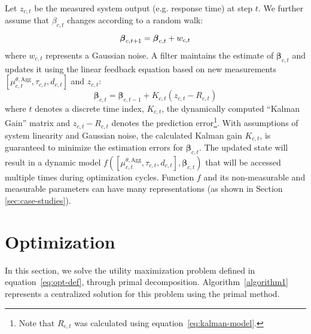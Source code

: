 Let $z_{c,t}$ be the measured system output (e.g. response time) at step $t$. 
We further assume that $\beta_{c,t}$ changes according to a random walk:
\begin{equation}
	\boldsymbol\beta_{c,t+1}=\boldsymbol\beta_{c,t}+w_{c,t} \\
\end{equation}
where $w_{c,t}$ represents a Gaussian noise.
A filter maintains the estimate of $\boldsymbol\beta_{c,t}$ and updates it using the linear feedback equation based on new measurements $\left[\mu^{\theta,\text{Agg}}_{c,t},\tau_{c,t},d_{c,t}\right]$ and $z_{c,t}$: 
\begin{equation}\label{eq:kalman-update} 
	\boldsymbol\beta_{c,t} = \boldsymbol\beta_{c,t-1}+ K_{c,t}(z_{c,t} - R_{c,t})
\end{equation}
where $t$ denotes a discrete time index, $K_{c,t}$, the dynamically computed
``Kalman Gain'' matrix and $z_{c,t}-R_{c,t}$ denotes the prediction error\footnote{Note that $R_{c,t}$ was calculated using equation~\ref{eq:kalman-model}.}. With assumptions of system linearity and Gaussian noise, the calculated Kalman gain $K_{c,t}$, is guaranteed to minimize the 
estimation errors for $\boldsymbol\beta_{c,t}$. The updated state will result in a dynamic
model $f(\left[\mu^{\theta,\text{Agg}}_{c,t},\tau_{c,t},d_{c,t}\right],\boldsymbol\beta_{c,t})$ that will be accessed multiple times during optimization cycles. 
Function $f$ and its non-measurable and  measurable parameters can have many representations (as shown in Section \ref{sec:case-studies}). 

\section{Optimization}
\label{sec:optimization-through-subgradient}
In this section, we solve the utility maximization problem defined in equation~\ref{eq:opt-def}, through primal decomposition. Algorithm~\ref{algorithm1} represents a centralized solution for this problem using the primal method.  

